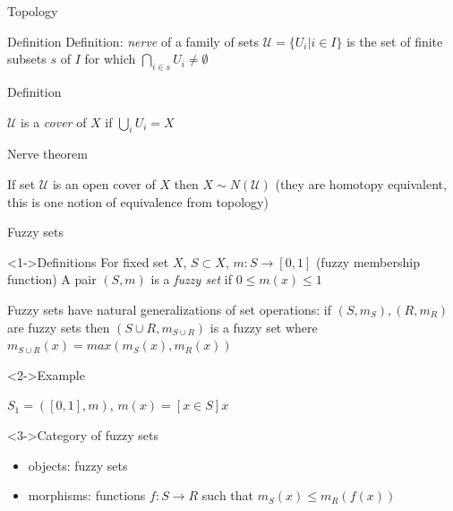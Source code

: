 \documentclass[unknownkeysallowed]{beamer}
\begin{document}
\begin{frame}{Topology}

	\begin{block}{Definition}
	Definition: \textit{nerve} of a family of sets $\mathcal{U} = \{U_i| i \in I \}$ is the set of finite subsets $s$ of $I$ for which $\bigcap_{i \in s} U_i \neq \emptyset$
	\end{block}

	\begin{block}{Definition}

	$\mathcal{U}$ is a \textit{cover} of $X$ if $\bigcup_i U_i = X$
	\end{block}

	\begin{block}{Nerve theorem}

	If set $\mathcal{U}$ is an open cover of $X$  then $X \sim N(\mathcal{U})$ (they are homotopy equivalent, this is one notion of equivalence from topology)

	\end{block}
\end{frame}

\begin{frame}{Fuzzy sets}

    \begin{block}<1->{Definitions}
    For fixed set $X$, $S \subset X$, $m: S \to [0, 1]$ (fuzzy membership function)
    \break
    A pair $(S, m)$ is a \textit{fuzzy set} if $0 \leq m(x) \leq 1$

    Fuzzy sets have natural generalizations of set operations: 
    \break
    if $(S, m_S), (R, m_R)$ are fuzzy sets then 
    \break
    $(S \cup R, m_{S \cup R})$ is a fuzzy set
    \break
    where
    \break
    $m_{S \cup R}(x) = max(m_S(x), m_R(x))$
    \end{block}

    \begin{exampleblock}<2->{Example}

    $S_1 = ([0, 1], m)$, $m(x) = [x \in S] x$

    \end{exampleblock}
    
    \begin{block}<3->{Category of fuzzy sets}
    	\begin{itemize}
    		\item objects: fuzzy sets
    		\item morphisms: functions $f: S \to R$ such that $m_S(x) \leq m_R(f(x))$
    	\end{itemize}
    \end{block}

\end{frame}
\end{document}
